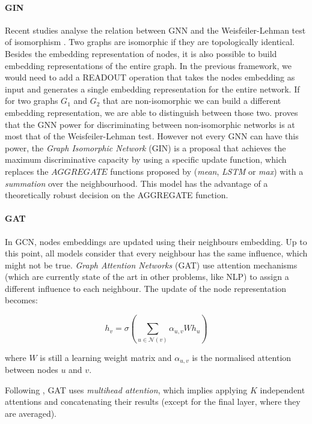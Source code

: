 \documentclass[smallextended]{svjour3}
\begin{document}
\begin{appendices}
		\paragraph{GIN}
		Recent studies analyse the relation between GNN and the Weisfeiler-Lehman test of isomorphism \parencite{xu_how_2019}. Two graphs are isomorphic if they are topologically identical. Besides the embedding representation of nodes, it is also possible to build embedding representations of the entire graph. In the previous framework, we would need to add a READOUT operation that takes the nodes embedding as input and generates a single embedding representation for the entire network. If for two graphs $G_1$ and $G_2$ that are non-isomorphic we can build a different embedding representation, we are able to distinguish between those two. \cite{xu_how_2019} proves that the GNN power for discriminating between non-isomorphic networks is at most that of the Weisfeiler-Lehman test. However not every GNN can have this power, the \textit{Graph Isomorphic Network} (GIN) is a proposal that achieves the maximum discriminative capacity by using a specific update function, which replaces the $AGGREGATE$ functions proposed by \cite{hamilton_inductive_2017} (\textit{mean}, \textit{LSTM} or \textit{max}) with a \textit{summation} over the neighbourhood. This model has the advantage of a theoretically robust decision on the AGGREGATE function. 
		
		\paragraph{GAT}
		In GCN, nodes embeddings are updated using their neighbours embedding. Up to this point, all models consider that every neighbour has the same influence, which might not be true. \textit{Graph Attention Networks } (GAT) \cite{velickovic_graph_2018} use attention mechanisms (which are currently state of the art in other problems, like NLP) to assign a different influence to each neighbour. The update of the node representation becomes:
		
		$$
		h_v = \sigma (\sum_{u \in \mathcal{N}(v)} \alpha_{u,v}Wh_u)
		$$
		
		where $W$ is still a learning weight matrix and $\alpha_{u,v}$ is the normalised attention between nodes $u$ and $v$.
		
		Following \cite{vaswani_attention_2017}, GAT uses \textit{multihead attention}, which implies applying $K$ independent attentions and concatenating their results (except for the final layer, where they are averaged).
		

\end{appendices}
\end{document}
